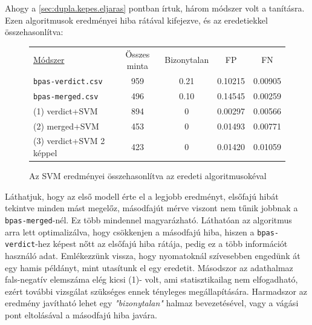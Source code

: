%
Ahogy a \ref{sec:dupla.kepes.eljaras} pontban írtuk, három módszer volt a tanításra.
Ezen algoritmusok eredményei hiba rátával kifejezve, és az eredetiekkel összehasonlítva:

\begin{figure}[h!]
	\centering
	\begin{tabular}{ l c c c c }
		\underline{Módszer} 		& Összes minta 	& Bizonytalan	& FP	& FN \\
		\texttt{bpas-verdict.csv}\footnotemark[\value{footnote}] 	& 959 			& 0.21			& 0.10215 	& 0.00905 	\\
		\texttt{bpas-merged.csv}\footnotemark[\value{footnote}] 	& 496			& 0.10			& 0.14545 	& 0.00259   \\
		
		\hline
		(1) verdict+SVM					& 894			& 0				& 0.00297	& 0.00566	\\
		(2) merged+SVM					& 453			& 0				& 0.01493	& 0.00771	\\
		(3) verdict+SVM 2 képpel		& 423			& 0				& 0.01420	& 0.01059   \\
		
	\end{tabular}

	\caption{Az SVM eredményei összehasonlítva az eredeti algoritmusokéval}

\end{figure}







Láthatjuk, hogy az első modell érte el a legjobb eredményt, elsőfajú hibát tekintve minden mást megelőz, 
másodfajút mérve viszont nem tűnik jobbnak a \texttt{bpas-merged}-nél. Ez több mindennel magyarázható.
Láthatóan az algoritmus arra lett optimalizálva, hogy csökkenjen a másodfajú hiba, hiszen a 
\texttt{bpas-verdict}-hez képest nőtt az elsőfajú hiba rátája, pedig ez a több információt használó adat.
Emlékezzünk vissza, hogy nyomatoknál szívesebben engedünk át egy hamis példányt, mint utasítunk
el egy eredetit. Másodszor az adathalmaz fals-negatív elemszáma elég kicsi (1)- volt, ami 
statisztikailag nem elfogadható, ezért további vizsgálat szükséges ennek tényleges megállapítására.
Harmadszor az eredmény javítható lehet egy \textit{"bizonytalan"} halmaz bevezetésével, vagy 
a vágási pont eltolásával a másodfajú hiba javára.


